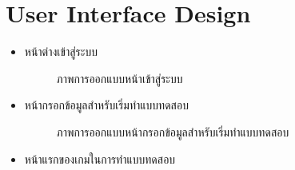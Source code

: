 \documentclass[12pt,oneside,openright,a4paper]{cpe-thai-project}
\begin{document}
\section{User Interface Design}
\begin{itemize}
  \item หน้าต่างเข้าสู่ระบบ
  \begin{figure}[!ht]\centering
    \setlength{\fboxrule}{0.2mm} %
    \setlength{\fboxsep}{1cm}
    \caption{ภาพการออกแบบหน้าเข้าสู่ระบบ}\label{fig:system}
  \end{figure}
  \item หน้ากรอกข้อมูลสำหรับเริ่มทำแบบทดสอบ
  \begin{figure}[!ht]\centering
    \setlength{\fboxrule}{0.2mm} %
    \setlength{\fboxsep}{1cm}
    \caption{ภาพการออกแบบหน้ากรอกข้อมูลสำหรับเริ่มทำแบบทดสอบ}\label{fig:system}
  \end{figure}
  \newpage
  \item หน้าแรกของเกมในการทำแบบทดสอบ

\end{itemize}
\end{document}
